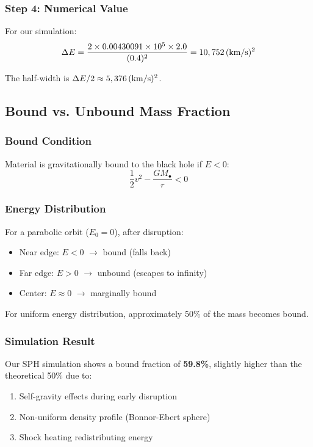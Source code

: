 \documentclass[twocolumn,amsmath,amssymb,prd,superscriptaddress,nofootinbib]{revtex4-2}
\begin{document}
\subsubsection{Step 4: Numerical Value}

For our simulation:
\begin{equation}
    \Delta E = \frac{2 \times 0.00430091 \times 10^5 \times 2.0}{(0.4)^2} = 10,752\,({\rm km/s})^2
\end{equation}

The half-width is $\Delta E/2 \approx 5,376\,({\rm km/s})^2$.

\subsection{Bound vs. Unbound Mass Fraction}
\label{sec:bound_fraction}

\subsubsection{Bound Condition}

Material is gravitationally bound to the black hole if $E < 0$:
\begin{equation}
    \frac{1}{2}v^2 - \frac{GM_\bullet}{r} < 0
\end{equation}

\subsubsection{Energy Distribution}

For a parabolic orbit ($E_0 = 0$), after disruption:
\begin{itemize}
    \item Near edge: $E < 0$ $\rightarrow$ bound (falls back)
    \item Far edge: $E > 0$ $\rightarrow$ unbound (escapes to infinity)
    \item Center: $E \approx 0$ $\rightarrow$ marginally bound
\end{itemize}

For uniform energy distribution, approximately 50\% of the mass becomes bound.

\subsubsection{Simulation Result}

Our SPH simulation shows a bound fraction of \textbf{59.8\%}, slightly higher than the theoretical 50\% due to:
\begin{enumerate}
    \item Self-gravity effects during early disruption
    \item Non-uniform density profile (Bonnor-Ebert sphere)
    \item Shock heating redistributing energy
\end{enumerate}
\end{document}
